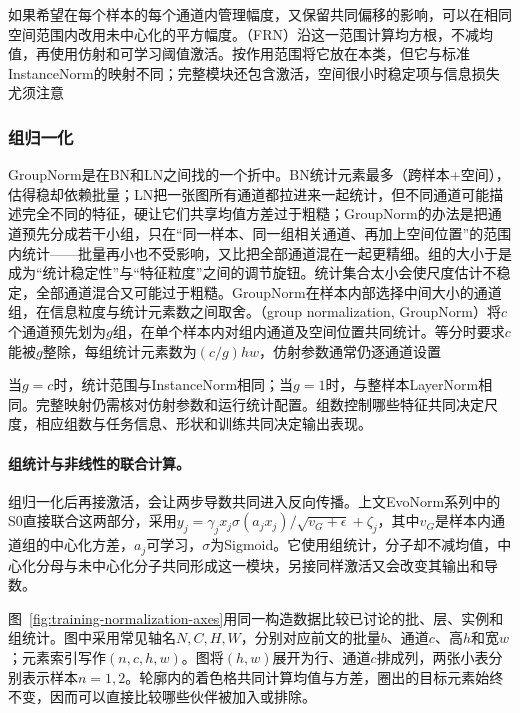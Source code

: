 如果希望在每个样本的每个通道内管理幅度，又保留共同偏移的影响，可以在相同空间范围内改用未中心化的平方幅度。（FRN）沿这一范围计算均方根，不减均值，再使用仿射和可学习阈值激活。按作用范围将它放在本类，但它与标准InstanceNorm的映射不同；完整模块还包含激活，空间很小时稳定项与信息损失尤须注意

\subsubsection{组归一化}
\label{sec:training-groupnorm}
\label{sec:training-instance-groupnorm}
\label{sec:training-evonorm}
GroupNorm是在BN和LN之间找的一个折中。BN统计元素最多（跨样本+空间），估得稳却依赖批量；LN把一张图所有通道都拉进来一起统计，但不同通道可能描述完全不同的特征，硬让它们共享均值方差过于粗糙；GroupNorm的办法是把通道预先分成若干小组，只在“同一样本、同一组相关通道、再加上空间位置”的范围内统计——批量再小也不受影响，又比把全部通道混在一起更精细。组的大小于是成为“统计稳定性”与“特征粒度”之间的调节旋钮。统计集合太小会使尺度估计不稳定，全部通道混合又可能过于粗糙。GroupNorm在样本内部选择中间大小的通道组，在信息粒度与统计元素数之间取舍。（group normalization, GroupNorm）将$c$个通道预先划为$g$组，在单个样本内对组内通道及空间位置共同统计。等分时要求$c$能被$g$整除，每组统计元素数为$(c/g)hw$，仿射参数通常仍逐通道设置

当$g=c$时，统计范围与InstanceNorm相同；当$g=1$时，与整样本LayerNorm相同。完整映射仍需核对仿射参数和运行统计配置。组数控制哪些特征共同决定尺度，相应组数与任务信息、形状和训练共同决定输出表现。

\paragraph{组统计与非线性的联合计算。}

组归一化后再接激活，会让两步导数共同进入反向传播。上文EvoNorm系列中的S0直接联合这两部分，采用$y_j=\gamma_jx_j\sigma(a_jx_j)/\sqrt{v_G+\epsilon}+\zeta_j$，其中$v_G$是样本内通道组的中心化方差，$a_j$可学习，$\sigma$为Sigmoid。它使用组统计，分子却不减均值，中心化分母与未中心化分子共同形成这一模块，另接同样激活又会改变其输出和导数。

图~\ref{fig:training-normalization-axes}用同一构造数据比较已讨论的批、层、实例和组统计。图中采用常见轴名$N,C,H,W$，分别对应前文的批量$b$、通道$c$、高$h$和宽$w$；元素索引写作$(n,c,h,w)$。图将$(h,w)$展开为行、通道$c$排成列，两张小表分别表示样本$n=1,2$。轮廓内的着色格共同计算均值与方差，圈出的目标元素始终不变，因而可以直接比较哪些伙伴被加入或排除。

